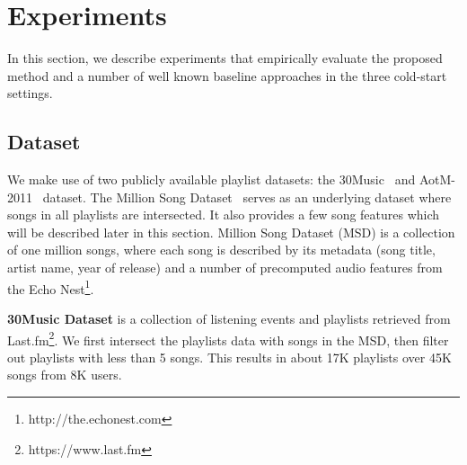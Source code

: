 \section{Experiments}
\label{sec:experiment}


In this section, we describe experiments that empirically evaluate the proposed method and a number of 
well known baseline approaches in the three cold-start settings. %


\subsection{Dataset}
We make use of two publicly available playlist datasets: the 30Music~\cite{30music2015} and AotM-2011~\cite{mcfee2012hypergraph} dataset.
The Million Song Dataset~\cite{msd2011} serves as an underlying dataset where songs in all playlists are intersected.
It also provides a few song features which will be described later in this section.
Million Song Dataset (MSD) is a collection of one million songs, where each song is described by its metadata 
(\eg song title, artist name, year of release) and a number of precomputed audio features from the Echo Nest\footnote{http://the.echonest.com}.


\begin{table}[hbt]
\centering
\caption{Music playlist dataset}
\label{tab:stats_pldata}
\end{table}



\noindent
{\bf 30Music Dataset} is a collection of listening events and playlists retrieved from Last.fm\footnote{https://www.last.fm}.
We first intersect the playlists data with songs in the MSD, 
then filter out playlists with less than 5 songs.
This results in about 17K playlists over 45K songs from 8K users.


